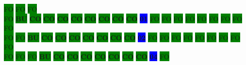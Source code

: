 \colorbox{green}{\color[gray]{0.75}FO}%
\colorbox{green}{\color[gray]{0.75}FO}%
\colorbox{green}{\color[gray]{0.75}FO}%
\\
\colorbox{green}{\color[gray]{0.75}FO}%
\colorbox{green}{\color[rgb]{1,0,0}\textbf{BU}}%
\colorbox{green}{\color[rgb]{0,0,0}\textbf{CO}}%
\colorbox{green}{\color[rgb]{0,0,0}\textbf{CO}}%
\colorbox{green}{\color[rgb]{0,0,0}\textbf{CO}}%
\colorbox{green}{\color[rgb]{0,0,0}\textbf{CO}}%
\colorbox{green}{\color[rgb]{0,0,0}\textbf{CO}}%
\colorbox{green}{\color[rgb]{0,0,0}\textbf{CO}}%
\colorbox{green}{\color[rgb]{0,0,0}\textbf{CO}}%
\colorbox{green}{\color[rgb]{0,0,0}\textbf{CO}}%
\colorbox{blue}{\color[rgb]{1,0,0}\textbf{01}}%
\colorbox{green}{\color[gray]{0.75}FO}%
\colorbox{green}{\color[gray]{0.75}FO}%
\colorbox{green}{\color[gray]{0.75}FO}%
\colorbox{green}{\color[gray]{0.75}FO}%
\colorbox{green}{\color[gray]{0.75}FO}%
\colorbox{green}{\color[gray]{0.75}FO}%
\colorbox{green}{\color[gray]{0.75}FO}%
\colorbox{green}{\color[gray]{0.75}FO}%
\colorbox{green}{\color[gray]{0.75}FO}%
\\
\colorbox{green}{\color[gray]{0.75}FO}%
\colorbox{green}{\color[gray]{0.75}FO}%
\colorbox{green}{\color[rgb]{1,0,0}\textbf{BU}}%
\colorbox{green}{\color[rgb]{0,0,0}\textbf{CO}}%
\colorbox{green}{\color[rgb]{0,0,0}\textbf{CO}}%
\colorbox{green}{\color[rgb]{0,0,0}\textbf{CO}}%
\colorbox{green}{\color[rgb]{0,0,0}\textbf{CO}}%
\colorbox{green}{\color[rgb]{0,0,0}\textbf{CO}}%
\colorbox{green}{\color[rgb]{0,0,0}\textbf{CO}}%
\colorbox{green}{\color[rgb]{0,0,0}\textbf{CO}}%
\colorbox{blue}{\color[rgb]{1,0,0}\textbf{02}}%
\colorbox{green}{\color[gray]{0.75}FO}%
\colorbox{green}{\color[gray]{0.75}FO}%
\colorbox{green}{\color[gray]{0.75}FO}%
\colorbox{green}{\color[gray]{0.75}FO}%
\colorbox{green}{\color[gray]{0.75}FO}%
\colorbox{green}{\color[gray]{0.75}FO}%
\colorbox{green}{\color[gray]{0.75}FO}%
\colorbox{green}{\color[gray]{0.75}FO}%
\colorbox{green}{\color[gray]{0.75}FO}%
\\
\colorbox{green}{\color[gray]{0.75}FO}%
\colorbox{green}{\color[gray]{0.75}FO}%
\colorbox{green}{\color[gray]{0.75}FO}%
\colorbox{green}{\color[rgb]{1,0,0}\textbf{BU}}%
\colorbox{green}{\color[rgb]{0,0,0}\textbf{CO}}%
\colorbox{green}{\color[rgb]{0,0,0}\textbf{CO}}%
\colorbox{green}{\color[rgb]{0,0,0}\textbf{CO}}%
\colorbox{green}{\color[rgb]{0,0,0}\textbf{CO}}%
\colorbox{green}{\color[rgb]{0,0,0}\textbf{CO}}%
\colorbox{green}{\color[rgb]{0,0,0}\textbf{CO}}%
\colorbox{green}{\color[rgb]{0,0,0}\textbf{CO}}%
\colorbox{blue}{\color[rgb]{1,0,0}\textbf{04}}%
\colorbox{green}{\color[gray]{0.75}FO}%

